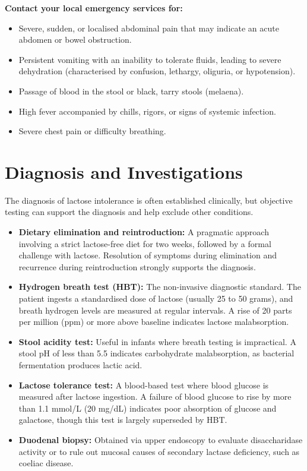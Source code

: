 \textbf{Contact your local emergency services for:}
\begin{itemize}
    \item Severe, sudden, or localised abdominal pain that may indicate an acute abdomen or bowel obstruction.
    \item Persistent vomiting with an inability to tolerate fluids, leading to severe dehydration (characterised by confusion, lethargy, oliguria, or hypotension).
    \item Passage of blood in the stool or black, tarry stools (melaena).
    \item High fever accompanied by chills, rigors, or signs of systemic infection.
    \item Severe chest pain or difficulty breathing.
\end{itemize}

\section*{Diagnosis and Investigations}
The diagnosis of lactose intolerance is often established clinically, but objective testing can support the diagnosis and help exclude other conditions.

\begin{itemize}
    \item \textbf{Dietary elimination and reintroduction:} A pragmatic approach involving a strict lactose-free diet for two weeks, followed by a formal challenge with lactose. Resolution of symptoms during elimination and recurrence during reintroduction strongly supports the diagnosis.
    \item \textbf{Hydrogen breath test (HBT):} The non-invasive diagnostic standard. The patient ingests a standardised dose of lactose (usually 25 to 50 grams), and breath hydrogen levels are measured at regular intervals. A rise of 20 parts per million (ppm) or more above baseline indicates lactose malabsorption.
    \item \textbf{Stool acidity test:} Useful in infants where breath testing is impractical. A stool pH of less than 5.5 indicates carbohydrate malabsorption, as bacterial fermentation produces lactic acid.
    \item \textbf{Lactose tolerance test:} A blood-based test where blood glucose is measured after lactose ingestion. A failure of blood glucose to rise by more than 1.1 mmol/L (20 mg/dL) indicates poor absorption of glucose and galactose, though this test is largely superseded by HBT.
    \item \textbf{Duodenal biopsy:} Obtained via upper endoscopy to evaluate disaccharidase activity or to rule out mucosal causes of secondary lactase deficiency, such as coeliac disease.
\end{itemize}

